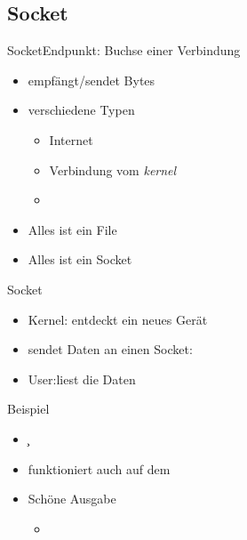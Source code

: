 \subsection{Socket}
\begin{frame}{Socket}{Endpunkt: Buchse einer Verbindung}
 \begin{itemize}
  \item empfängt/sendet Bytes
  \item verschiedene Typen
  \begin{itemize}
   \item Internet 
   \item Verbindung vom {\em kernel}
   \item {}
  \end{itemize}
  \item Alles ist ein File
  \item Alles ist ein Socket
 \end{itemize}
\end{frame}


\begin{frame}{Socket}
 \begin{itemize}
  \item Kernel: \ksp entdeckt ein neues Gerät
  \item sendet Daten an einen Socket: 
  \item User:\usp liest die Daten
 \end{itemize}
\end{frame}


\begin{frame}{Beispiel}{}
 \begin{itemize}
  \item \c 
  \item funktioniert auch auf dem \host
  \item Schöne Ausgabe
  \begin{itemize}
   \item {}
  \end{itemize}
 \end{itemize}
\end{frame}
